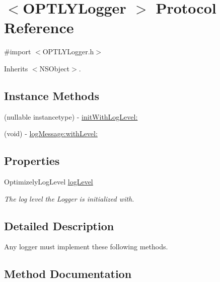 \hypertarget{protocol_o_p_t_l_y_logger_01-p}{}\section{$<$O\+P\+T\+L\+Y\+Logger $>$ Protocol Reference}
\label{protocol_o_p_t_l_y_logger_01-p}


{\ttfamily \#import $<$O\+P\+T\+L\+Y\+Logger.\+h$>$}



Inherits $<$\+N\+S\+Object$>$.

\subsection*{Instance Methods}
\begin{DoxyCompactItemize}
\item 
(nullable instancetype) -\/ \mbox{\hyperlink{protocol_o_p_t_l_y_logger_01-p_a78b9ba674dd53756ffa1ecf0e877e105}{init\+With\+Log\+Level\+:}}
\item 
(void) -\/ \mbox{\hyperlink{protocol_o_p_t_l_y_logger_01-p_ada43d041642cbaab84a54b8b7d7d7681}{log\+Message\+:with\+Level\+:}}
\end{DoxyCompactItemize}
\subsection*{Properties}
\begin{DoxyCompactItemize}
\item 
\mbox{\label{protocol_o_p_t_l_y_logger_01-p_a7cb017169d62a344183db4928889bc6d}} 
Optimizely\+Log\+Level \mbox{\hyperlink{protocol_o_p_t_l_y_logger_01-p_a7cb017169d62a344183db4928889bc6d}{log\+Level}}
\begin{DoxyCompactList}\small\item\em The log level the Logger is initialized with. \end{DoxyCompactList}\end{DoxyCompactItemize}


\subsection{Detailed Description}
Any logger must implement these following methods. 

\subsection{Method Documentation}
\mbox{\label{protocol_o_p_t_l_y_logger_01-p_a78b9ba674dd53756ffa1ecf0e877e105}} 
